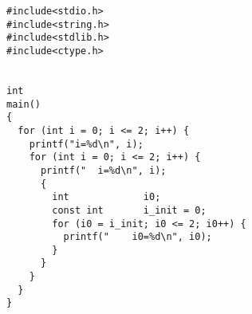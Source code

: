  \begin{verbatim}
#include<stdio.h>
#include<string.h>
#include<stdlib.h>
#include<ctype.h>


int
main()
{
  for (int i = 0; i <= 2; i++) {
    printf("i=%d\n", i);
    for (int i = 0; i <= 2; i++) {
      printf("  i=%d\n", i);
      {
        int             i0;
        const int       i_init = 0;
        for (i0 = i_init; i0 <= 2; i0++) {
          printf("    i0=%d\n", i0);
        }
      }
    }
  }
}
\end{verbatim} 